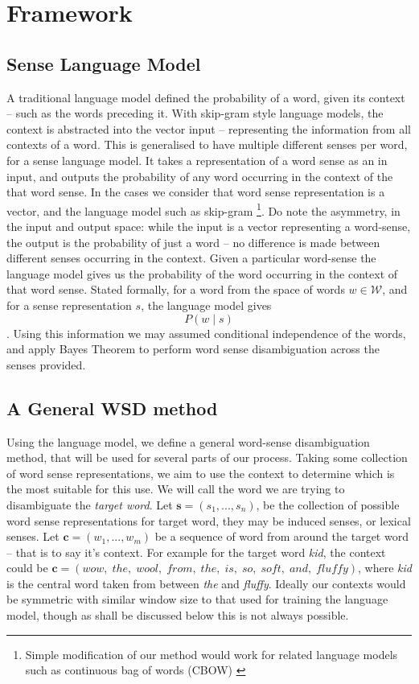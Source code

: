 \documentclass{sig-alternate}
\newcommand{\W}{\mathcal{W}}
\renewcommand{\c}{\mathbf{c}}
\begin{document}
\section{Framework}


\subsection{Sense Language Model}
A traditional language model defined the probability of a word, given its context -- such as the words preceding it.
With skip-gram style language models, the context is abstracted into the vector input -- representing the information from all contexts of a word. This is generalised to have multiple different senses per word, for a sense language model.
It takes a representation of a word sense as an in input, and outputs the probability of any word occurring in the context of the that word sense. In the cases we consider that word sense representation is a vector, and the language model such as skip-gram\parencite{mikolov2013efficient} \footnote{Simple modification of our method would work for related language models such as continuous bag of words (CBOW) \parencite{mikolov2013efficient}}. Do note the asymmetry, in the input and output space: while the input is a vector representing a word-sense, the output is the probability of just a word -- no difference is made between different senses occurring in the context. Given a particular word-sense the language model gives us the probability of the word occurring in the context of that word sense. Stated formally, for a word from the space of words $w\in \W$, and for a sense representation $s$, the language model gives $$P(w \mid s)$$. Using this information we may assumed conditional independence of the words, and apply Bayes Theorem to perform word sense disambiguation across the senses provided.

\subsection{A General WSD method}
Using the language model, we define a general word-sense disambiguation method, that will be used for several parts of our process.
Taking some collection of word sense representations, we aim to use the context to determine which is the most suitable for this use.
We will call the word we are trying to disambiguate the \emph{target word}.
Let $\mathbf{s}=(s_{1},...,s_{n})$, be the collection of possible word sense representations for target word, they may be induced senses, or lexical senses.
Let $\c=(w_{1},...,w_{m})$ be a sequence of word from around the target word -- that is to say it's context.
For example for the target word \emph{kid}, the context could be \mbox{$\c=(wow,\; the,\; wool,\; from,\; the,\; is,\; so,\; soft,\; and,\; fluffy)$}, where \emph{kid} is the central word taken from between \emph{the} and \emph{fluffy}.
Ideally our contexts would be symmetric with similar window size to that used for training the language model, though as shall be discussed below this is not always possible.
 
\end{document}
